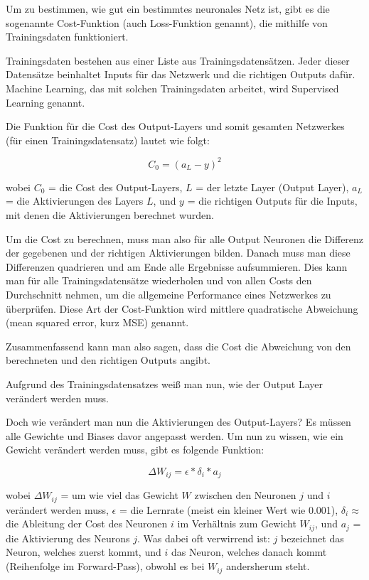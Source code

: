 \documentclass{scrartcl}
\begin{document}

	Um zu bestimmen, wie gut ein bestimmtes neuronales Netz ist, gibt es die sogenannte Cost-Funktion (auch Loss-Funktion genannt), die mithilfe von Trainingsdaten funktioniert.
	
	Trainingsdaten bestehen aus einer Liste aus Trainingsdatensätzen. Jeder dieser Datensätze beinhaltet Inputs für das Netzwerk und die richtigen Outputs dafür. Machine Learning, das mit solchen Trainingsdaten arbeitet, wird Supervised Learning genannt.

	Die Funktion für die Cost des Output-Layers und somit gesamten Netzwerkes (für einen Trainingsdatensatz) lautet wie folgt:

	{\Large \[
		C_0 = (a_L - y)^2
	\]}


	\noindent wobei $C_0$ = die Cost des Output-Layers, $L$ = der letzte Layer (Output Layer), $a_L$ = die Aktivierungen des Layers $L$, und $y$ = die richtigen Outputs für die Inputs, mit denen die Aktivierungen berechnet wurden. 
	
	Um die Cost zu berechnen, muss man also für alle Output Neuronen die Differenz der gegebenen und der richtigen Aktivierungen bilden. Danach muss man diese Differenzen quadrieren und am Ende alle Ergebnisse aufsummieren. Dies kann man für alle Trainingsdatensätze wiederholen und von allen Costs den Durchschnitt nehmen, um die allgemeine Performance eines Netzwerkes zu überprüfen. Diese Art der Cost-Funktion wird mittlere quadratische Abweichung (mean squared error, kurz MSE) genannt. 
	
	Zusammenfassend kann man also sagen, dass die Cost die Abweichung von den berechneten und den richtigen Outputs angibt.
	
	Aufgrund des Trainingsdatensatzes weiß man nun, wie der Output Layer verändert werden
	muss.


	Doch wie verändert man nun die Aktivierungen des Output-Layers? Es müssen alle Gewichte und Biases davor angepasst werden. Um nun zu wissen, wie ein Gewicht verändert werden muss, gibt es folgende Funktion:

	{\Large \[
		\Delta W_{ij} = \epsilon * \delta_i * a_j
	\]}

	wobei $\Delta W_{ij}$ = um wie viel das Gewicht $W$ zwischen den Neuronen $j$ und $i$ verändert werden muss, $\epsilon$ = die Lernrate (meist ein kleiner Wert wie 0.001), $\delta_i \approx$ die Ableitung der Cost des Neuronen $i$ im Verhältnis zum Gewicht $W_{ij}$, und $a_j$ = die Aktivierung des Neurons $j$. Was dabei oft verwirrend ist: $j$ bezeichnet das Neuron, welches zuerst kommt, und $i$ das Neuron, welches danach kommt (Reihenfolge im Forward-Pass), obwohl es bei $W_{ij}$ andersherum steht.
\end{document}
